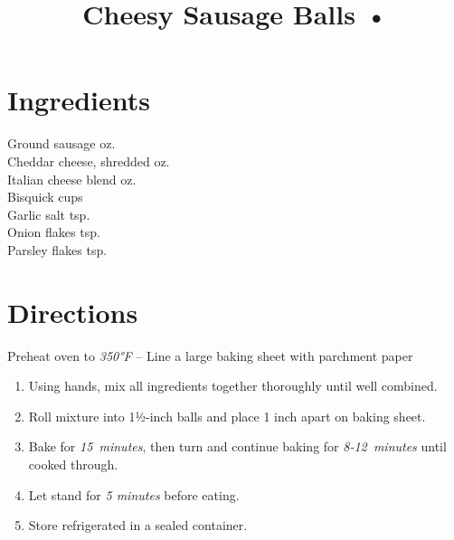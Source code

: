 \documentclass[11pt,letterpaper]{article}
\title{Cheesy Sausage Balls •}
\author{}
\date{}
\begin{document}
\maketitle
\thispagestyle{empty}

\section*{Ingredients}
\setlength{\columnsep}{20pt}
\begin{multicols}{2}
\noindent
    Ground sausage  oz. \\
    Cheddar cheese, shredded  oz. \\
    Italian cheese blend  oz. \\
    Bisquick  cups \\
    Garlic salt  tsp. \\
    Onion flakes  tsp. \\
    Parsley flakes  tsp.
\end{multicols}

\section*{Directions}

\noindent
Preheat oven to \textit{350°F} --
Line a large baking sheet with parchment paper

\begin{enumerate}
    \item Using hands, mix all ingredients together thoroughly until well combined.
    \item Roll mixture into 1½-inch balls and place 1 inch apart on baking sheet.
    \item Bake for \textit{15~minutes}, then turn and continue baking for \textit{8-12~minutes} until cooked through.
    \item Let stand for \textit{5 minutes} before eating.
    \item Store refrigerated in a sealed container.
\end{enumerate}
\end{document}
